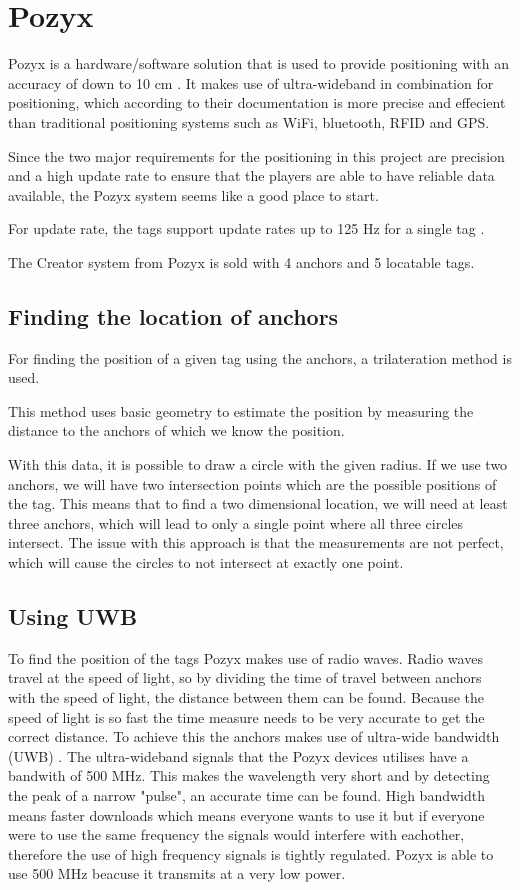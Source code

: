 \section{Pozyx}
Pozyx is a hardware/software solution that is used to provide positioning with an accuracy of down to 10 cm \cite{pozyx}.
It makes use of ultra-wideband in combination for positioning, which according to their documentation is more precise and effecient than traditional positioning systems such as WiFi, bluetooth, RFID and GPS.

Since the two major requirements for the positioning in this project are precision and a high update rate to ensure that the players are able to have reliable data available, the Pozyx system seems like a good place to start.

For update rate, the tags support update rates up to 125 Hz for a single tag \cite{pozyx}.

The Creator system from Pozyx is sold with 4 anchors and 5 locatable tags.

\subsection{Finding the location of anchors}
For finding the position of a given tag using the anchors, a trilateration method is used.

This method uses basic geometry to estimate the position by measuring the distance to the anchors of which we know the position.

With this data, it is possible to draw a circle with the given radius.
If we use two anchors, we will have two intersection points which are the possible positions of the tag.
This means that to find a two dimensional location, we will need at least three anchors, which will lead to only a single point where all three circles intersect.
The issue with this approach is that the measurements are not perfect, which will cause the circles to not intersect at exactly one point.

\subsection{Using UWB}
To find the position of the tags Pozyx makes use of radio waves. 
Radio waves travel at the speed of light, so by dividing the time of travel between anchors with the speed of light, the distance between them can be found.
Because the speed of light is so fast the time measure needs to be very accurate to get the correct distance.
To achieve this the anchors makes use of ultra-wide bandwidth (UWB) \cite{pozyx-UWB}.
The ultra-wideband signals that the Pozyx devices utilises have a bandwith of 500 MHz.
This makes the wavelength very short and by detecting the peak of a narrow "pulse", an accurate time can be found.
High bandwidth means faster downloads which means everyone wants to use it but if everyone were to use the same frequency the signals would interfere with eachother, therefore the use of high frequency signals is tightly regulated.
Pozyx is able to use 500 MHz beacuse it transmits at a very low power.


